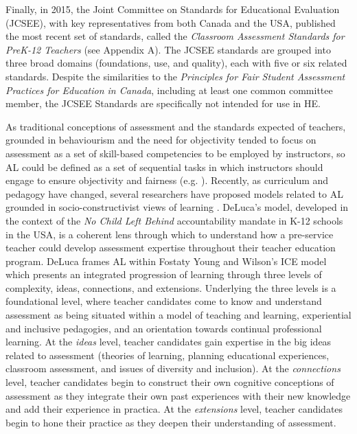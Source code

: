 \documentclass[
]{book}
\begin{document}
Finally, in 2015, the Joint Committee on Standards for Educational Evaluation (JCSEE), with key representatives from both Canada and the USA, published the most recent set of standards, called the \emph{Classroom Assessment Standards for PreK-12 Teachers} (see Appendix A). The JCSEE standards are grouped into three broad domains (foundations, use, and quality), each with five or six related standards. Despite the similarities to the \emph{Principles for Fair Student Assessment Practices for Education in Canada}, including at least one common committee member, the JCSEE Standards are specifically not intended for use in HE.

As traditional conceptions of assessment and the standards expected of teachers, grounded in behaviourism and the need for objectivity tended to focus on assessment as a set of skill-based competencies to be employed by instructors, so AL could be defined as a set of sequential tasks in which instructors should engage to ensure objectivity and fairness (e.g. \citep{natrielloImpactEvaluationProcesses1987}). Recently, as curriculum and pedagogy have changed, several researchers have proposed models related to AL grounded in socio-constructivist views of learning \citep{delucaPreparingTeachersAge2012, pastoreTeacherAssessmentLiteracy2019, xuTeacherAssessmentLiteracy2016}. DeLuca's \citeyearpar{delucaPreparingTeachersAge2012} model, developed in the context of the \emph{No Child Left Behind} accountability mandate in K-12 schools in the USA, is a coherent lens through which to understand how a pre-service teacher could develop assessment expertise throughout their teacher education program. DeLuca frames AL within Fostaty Young and Wilson's \citeyearpar{fostatyyoungAssessmentLearningICE2000} ICE model which presents an integrated progression of learning through three levels of complexity, ideas, connections, and extensions. Underlying the three levels is a foundational level, where teacher candidates come to know and understand assessment as being situated within a model of teaching and learning, experiential and inclusive pedagogies, and an orientation towards continual professional learning. At the \emph{ideas} level, teacher candidates gain expertise in the big ideas related to assessment (theories of learning, planning educational experiences, classroom assessment, and issues of diversity and inclusion). At the \emph{connections} level, teacher candidates begin to construct their own cognitive conceptions of assessment as they integrate their own past experiences with their new knowledge and add their experience in practica. At the \emph{extensions} level, teacher candidates begin to hone their practice as they deepen their understanding of assessment.
\end{document}
